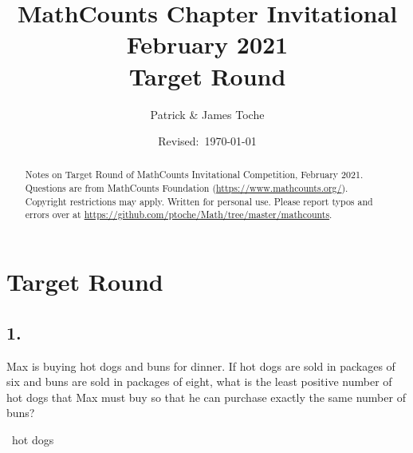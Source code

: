 \documentclass[12pt]{article}
\title{MathCounts Chapter Invitational February 2021 \\ Target Round}
\author{Patrick \& James Toche}
\date{Revised:~\today}
\begin{document}
\maketitle
\begin{minipage}{\textwidth}
\begin{abstract}\setlength{\parindent}{0pt}%
Notes on Target Round of MathCounts Invitational Competition, February 2021. 
Questions are from MathCounts Foundation (\url{https://www.mathcounts.org/}). Copyright restrictions may apply. Written for personal use. 
Please report typos and errors over at \url{https://github.com/ptoche/Math/tree/master/mathcounts}. 
\end{abstract}
\end{minipage}

\thispagestyle{empty}
\clearpage
\addtocounter{page}{-1}

\section*{Target Round}


\subsection*{1.}
Max is buying hot dogs and buns for dinner. If hot dogs are sold in packages of six and buns are sold in packages of eight, what is the least positive number of hot dogs that Max must buy so that he can purchase exactly the same number of buns? 

\fbox{\phantom{ANSWER}}~hot dogs

\begin{answer}
%
\end{answer}
\end{document}
